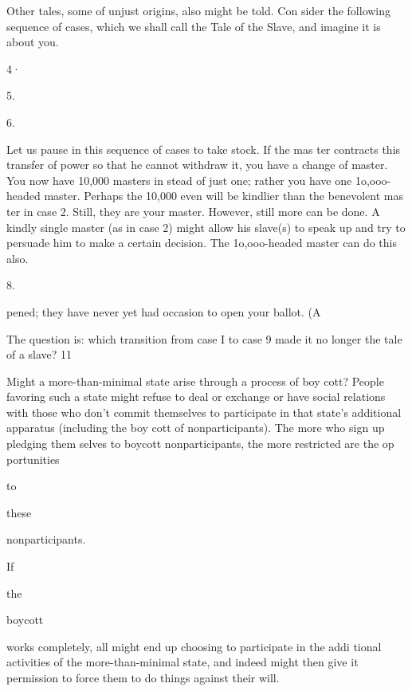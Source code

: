 \documentclass[11pt,openany]{book}
\begin{document}
Other tales, some of unjust origins, also might be told. Con sider the following sequence of cases, which we shall call the Tale of the Slave, and imagine it is about you. 

4· 

5. 

6. 

Let us pause in this sequence of cases to take stock. If the mas ter contracts this transfer of power so that he cannot withdraw it, you have a change of master. You now have 10,000 masters in stead of just one; rather you have one 1o,ooo-headed master. Perhaps the 10,000 even will be kindlier than the benevolent mas ter in case 2. Still, they are your master. However, still more can be done. A kindly single master (as in case 2) might allow his slave(s) to speak up and try to persuade him to make a certain decision. The 1o,ooo-headed master can do this also. 

8. 

pened; they have never yet had occasion to open your ballot. (A 

The question is: which transition from case I to case 9 made it no longer the tale of a slave? 11 

Might a more-than-minimal state arise through a process of boy cott? People favoring such a state might refuse to deal or exchange or have social relations with those who don't commit themselves to participate in that state's additional apparatus (including the boy cott of nonparticipants). The more who sign up pledging them selves to boycott nonparticipants, the more restricted are the op portunities 

to 

these 

nonparticipants. 

If 

the 

boycott 

works completely, all might end up choosing to participate in the addi tional activities of the more-than-minimal state, and indeed might then give it permission to force them to do things against their will. 
\end{document}
